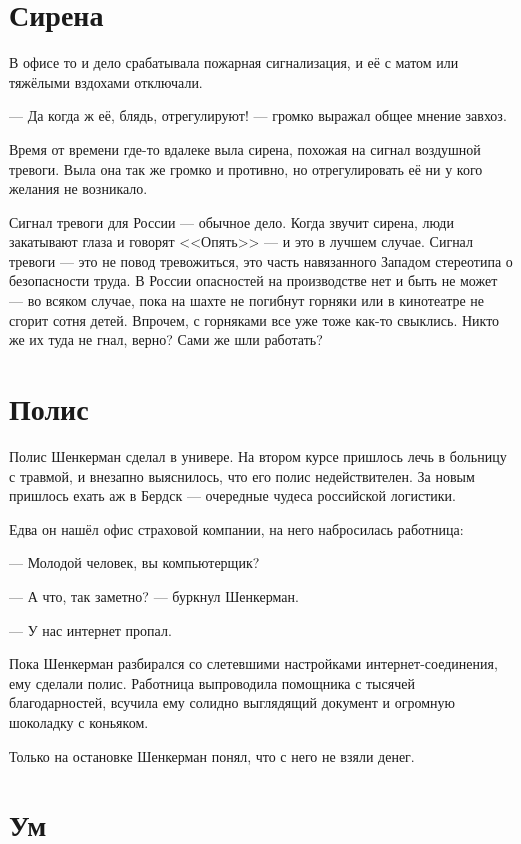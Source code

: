 \documentclass[a4paper,10pt,fleqn]{book}\usepackage{polyglossia}\setdefaultlanguage{english}\setotherlanguage{russian}\defaultfontfeatures{Ligatures=TeX,Mapping=tex-text} \usepackage{xcolor}\definecolor{lightgray}{HTML}{bbbbbb}\color{lightgray}\newcommand{\ml}[3]{\textcolor{black}{#3}}
\begin{document}
\section{Сирена}

В офисе то и дело срабатывала пожарная сигнализация, и её с матом или тяжёлыми вздохами отключали.

--- Да когда ж её, блядь, отрегулируют! --- громко выражал общее мнение завхоз.

Время от времени где-то вдалеке выла сирена, похожая на сигнал воздушной тревоги.
Выла она так же громко и противно, но отрегулировать её ни у кого желания не возникало.

Сигнал тревоги для России --- обычное дело.
Когда звучит сирена, люди закатывают глаза и говорят <<Опять>> --- и это в лучшем случае.
Сигнал тревоги --- это не повод тревожиться, это часть навязанного Западом стереотипа о безопасности труда.
В России опасностей на производстве нет и быть не может --- во всяком случае, пока на шахте не погибнут горняки или в кинотеатре не сгорит сотня детей.
Впрочем, с горняками все уже тоже как-то свыклись.
Никто же их туда не гнал, верно?
Сами же шли работать?

\section{Полис}

Полис Шенкерман сделал в универе.
На втором курсе пришлось лечь в больницу с травмой, и внезапно выяснилось, что его полис недействителен.
За новым пришлось ехать аж в Бердск --- очередные чудеса российской логистики.

Едва он нашёл офис страховой компании, на него набросилась работница:

--- Молодой человек, вы компьютерщик?

--- А что, так заметно? --- буркнул Шенкерман.

--- У нас интернет пропал.

Пока Шенкерман разбирался со слетевшими настройками интернет-соединения, ему сделали полис.
Работница выпроводила помощника с тысячей благодарностей, всучила ему солидно выглядящий документ и огромную шоколадку с коньяком.

Только на остановке Шенкерман понял, что с него не взяли денег.

\section{Ум}
\end{document}
